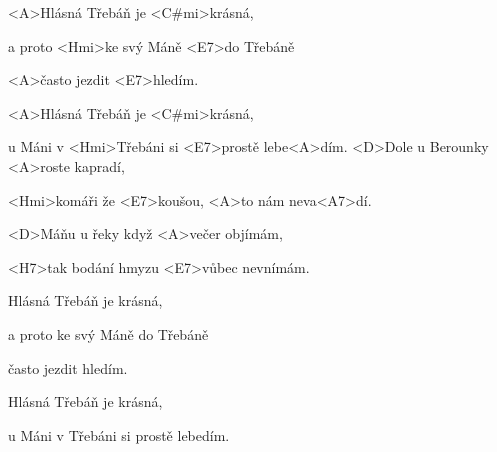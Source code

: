 
\zr
<A>Hlásná Třebáň je <C#mi>krásná,

a proto <Hmi>ke svý Máně <E7>do Třebáně

<A>často jezdit <E7>hledím.

<A>Hlásná Třebáň je <C#mi>krásná,

u Máni v <Hmi>Třebáni si <E7>prostě lebe<A>dím.
\kr
\zs
<D>Dole u Berounky <A>roste kapradí,

<Hmi>komáři že <E7>koušou, <A>to nám neva<A7>dí.

<D>Máňu u řeky když <A>večer objímám,

<H7>tak bodání hmyzu <E7>vůbec nevnímám.
\ks

\zr
Hlásná Třebáň je krásná,

a proto ke svý Máně do Třebáně

často jezdit hledím.

Hlásná Třebáň je krásná,

u Máni v Třebáni si prostě lebedím.
\kr
\kp
